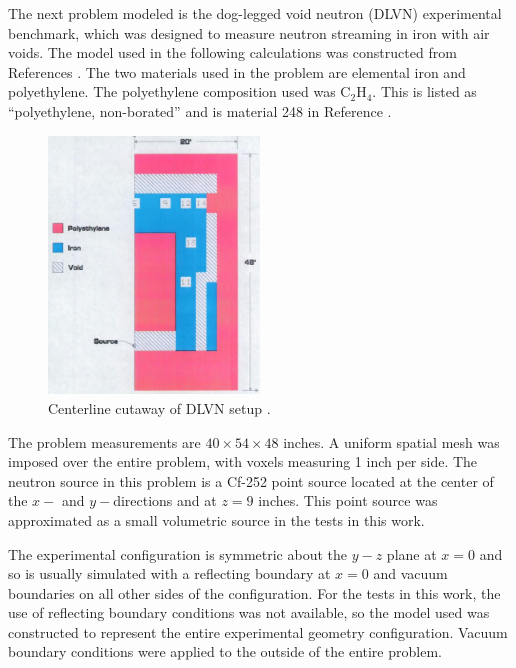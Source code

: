 \documentclass{article} %
\begin{document}
The next problem modeled is the dog-legged void neutron (DLVN) experimental 
benchmark, which was designed to measure neutron streaming in iron with air
voids. The model used in the following calculations was constructed from
References \cite{sw-dlvn,j-dlvn,dlvn1991}. The two materials used in the
problem are elemental iron and polyethylene. The polyethylene composition used
was C$_2$H$_4$. This is listed as ``polyethylene, non-borated'' and is material
248 in Reference \cite{pnnl}. 

\begin{figure}[!htb]
\centering
\includegraphics[width=0.5\textwidth]{img/dlvn.png}
\caption{Centerline cutaway of DLVN setup \cite{sw-dlvn}.}
\label{dlvn}
\end{figure}

The problem measurements are $40\times54\times48$ inches. A uniform spatial
mesh was imposed over the entire problem, with voxels measuring 1 inch per
side. The neutron source in this problem is a Cf-252 point source located at
the center of the $x-$ and $y-$directions and at $z = 9$ inches. This point
source was approximated as a small volumetric source in the tests in this
work.

The experimental configuration is symmetric about the $y-z$ plane at $x = 0$
and so is usually simulated with a reflecting boundary at $x = 0$ and vacuum
boundaries on all other sides of the configuration. For the tests in this work,
the use of reflecting boundary conditions was not available, so the model used 
was constructed to represent the entire experimental geometry configuration.
Vacuum boundary conditions were applied to the outside of the entire problem.

\end{document}
